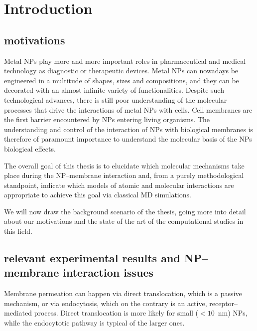 \chapter{Introduction}
%
%
%

\begingroup
\toclesssection
\introductionStyle

\section{motivations}
Metal \acp{NP} play more and more important roles in pharmaceutical and medical technology as diagnostic or therapeutic devices. Metal \acp{NP} can nowadays be engineered in a multitude of shapes, sizes and compositions, and they can be decorated with an almost infinite variety of functionalities. Despite such technological advances, there is still poor understanding of the molecular processes that drive the interactions of metal \acp{NP} with cells. Cell membranes are the first barrier encountered by \acp{NP} entering living organisms. The understanding and control of the interaction of \acp{NP} with biological membranes is therefore of paramount importance to understand the molecular basis of the \acp{NP} biological effects.

The overall goal of this thesis is to elucidate which molecular mechanisms take place during the \ac{NP}--membrane interaction and, from a purely methodological standpoint, indicate which models of atomic and molecular interactions are appropriate to achieve this goal via classical \ac{MD} simulations.

We will now draw the background scenario of the thesis, going more into detail about our motivations and the state of the art of the computational studies in this field.

\section{relevant experimental results and NP--membrane interaction issues}
Membrane permeation can happen via direct translocation, which is a passive mechanism, or via endocytosis, which on the contrary is an active, receptor--mediated process. Direct translocation is more likely for small ($< 10$~nm) \acp{NP}, while the endocytotic pathway is typical of the larger ones.

